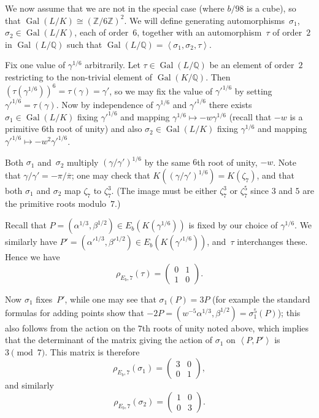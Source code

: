 \documentclass[12pt]{amsart}
\newcommand{\Q}{\mathbb{Q}}
\newcommand{\Z}{\mathbb{Z}}
\DeclareMathOperator{\Gal}{Gal}
\def\pibar{\overline{\pi}}
\numberwithin{equation}{section}
\theoremstyle{definition}
\theoremstyle{remark}
\begin{document}
We now assume that we are not in the special case (where $b/98$ is a
cube), so that $\Gal(L/K)\cong(\Z/6\Z)^2$.  We will define generating
automorphisms~$\sigma_1$, $\sigma_2\in\Gal(L/K)$, each of order~$6$,
together with an automorphism~$\tau$ of order~$2$ in $\Gal(L/\Q)$ such
that $\Gal(L/\Q)=\left<\sigma_1,\sigma_2,\tau\right>$.

Fix one value of $\gamma^{1/6}$ arbitrarily.  Let $\tau\in\Gal(L/\Q)$
be an element of order~$2$ restricting to the non-trivial element of
$\Gal(K/\Q)$.  Then $(\tau(\gamma^{1/6}))^6=\tau(\gamma)=\gamma'$, so
we may fix the value of $\gamma'^{1/6}$ by setting
$\gamma'^{1/6}=\tau(\gamma)$.  Now by independence of $\gamma^{1/6}$
and $\gamma'^{1/6}$ there exists $\sigma_1\in\Gal(L/K)$ fixing
$\gamma'^{1/6}$ and mapping $\gamma^{1/6}\mapsto-w\gamma^{1/6}$ (recall
that $-w$ is a primitive $6$th root of unity) and also
$\sigma_2\in\Gal(L/K)$ fixing $\gamma^{1/6}$ and mapping
$\gamma'^{1/6}\mapsto-w^2\gamma'^{1/6}$.

Both $\sigma_1$ and~$\sigma_2$ multiply $(\gamma/\gamma')^{1/6}$ by
the same $6$th root of unity, $-w$.  Note that
$\gamma/\gamma'=-\pi/\pibar$; one may check that
$K((\gamma/\gamma')^{1/6})=K(\zeta_7)$, and that both $\sigma_1$ and
$\sigma_2$ map $\zeta_7$ to $\zeta_7^3$.  (The image must be either
$\zeta_7^3$ or $\zeta_7^5$ since $3$ and $5$ are the primitive roots
modulo~$7$.)

Recall that $P=(\alpha^{1/3},\beta^{1/2})\in E_b(K(\gamma^{1/6}))$ is
fixed by our choice of $\gamma^{1/6}$.  We similarly have
$P'=(\alpha'^{1/3},\beta'^{1/2})\in E_b(K(\gamma'^{1/6}))$, and~$\tau$
interchanges these.  Hence we have
\[
   \rho_{E_b,7}(\tau) = \begin{pmatrix}0&1\\1&0   \end{pmatrix}.
\]


Now $\sigma_1$ fixes~$P'$, while one may see that $\sigma_1(P)=3P$
(for example the standard formulas for adding points show that
$-2P=(w^{-5}\alpha^{1/3},\beta^{1/2})=\sigma_1^5(P)$); this also
follows from the action on the $7$th roots of unity noted above, which
implies that the determinant of the matrix giving the action of
$\sigma_1$ on $\left<P,P'\right>$ is $3\pmod7$.  This matrix is
therefore
\[
   \rho_{E_b,7}(\sigma_1) = \begin{pmatrix}3&0\\0&1   \end{pmatrix},
\]
and similarly
\[
   \rho_{E_b,7}(\sigma_2) = \begin{pmatrix}1&0\\0&3   \end{pmatrix}.
\]
\end{document}
